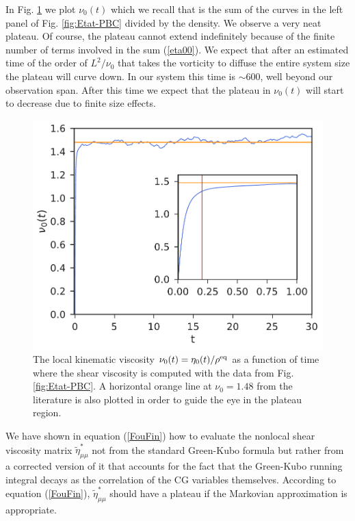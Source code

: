 \documentclass[b5paper,openright,10pt]{book}
\begin{document}
In Fig.
\ref{fig:KinVisc0t-PBC} we plot $\nu_0(t)$  which we recall that
is the sum  of the curves in  the left panel of Fig. \ref{fig:Etat-PBC} divided by the density. We observe  a very neat
plateau.  Of course, the plateau cannot extend indefinitely because of
the  finite number  of terms  involved  in the  sum (\ref{eta00}). We
expect that after  an estimated time of the order  of $L^2/\nu_0$ that
takes the vorticity to diffuse the entire system size the plateau will
curve down.  In our system  this time is  $\sim 600$, well  beyond our
observation  span. After  this  time  we expect  that  the plateau  in
$\nu_0(t)$ will start to decrease due to finite size effects.
\begin{figure}[h!]
  \centering
\includegraphics[scale=0.41]{KinVisc0t-PBC}
\caption[The local kinematic viscosity for an unconfined fluid]{The local kinematic viscosity $\nu_0(t)=\eta_0(t)/\rho^{\rm eq}$ as a function of time where the shear viscosity is computed with the data from Fig. \ref{fig:Etat-PBC}. A horizontal orange line at $\nu_0=1.48$ from the literature \cite{Woodcock2006} is also plotted in order to guide the eye in the plateau region.}
\label{fig:KinVisc0t-PBC}
\end{figure}

We have shown in  equation (\ref{FouFin}) how to evaluate  the nonlocal shear
viscosity  matrix  $\tilde{\eta}^*_{\mu\mu}$  not  from  the  standard
Green-Kubo  formula but  rather from  a corrected  version of  it that
accounts for the  fact that the Green-Kubo running  integral decays as
the correlation of  the CG variables themselves. 
According  to equation (\ref{FouFin}), $\tilde{\eta}^{*}_{\mu\mu}$  should have a plateau  if the
Markovian approximation is appropriate.
\end{document}
